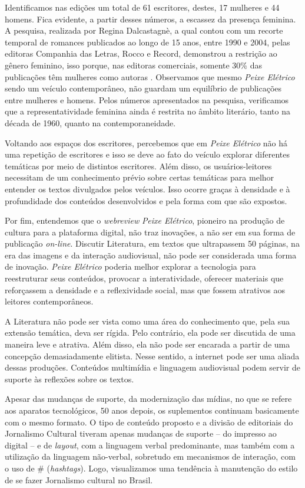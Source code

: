 \documentclass[portuguese]{textolivre}
\begin{document}
Identificamos nas edições um total de 61 escritores, destes, 17 mulheres e 44 homens. Fica evidente, a partir desses números, a escassez da presença feminina. A pesquisa, realizada por Regina Dalcastagnè, a qual contou com um recorte temporal de romances publicados ao longo de 15 anos, entre 1990 e 2004, pelas editoras Companhia das Letras, Rocco e Record, demonstrou a restrição ao gênero feminino, isso porque, nas editoras comerciais, somente 30\% das publicações têm mulheres como autoras \cite{dalcastagnè2005}. Observamos que mesmo \textit{Peixe Elétrico} sendo um veículo contemporâneo, não guardam um equilíbrio de publicações entre mulheres e homens. Pelos números apresentados na pesquisa, verificamos que a representatividade feminina ainda é restrita no âmbito literário, tanto na década de 1960, quanto na contemporaneidade.

Voltando aos espaços dos escritores, percebemos que em \textit{Peixe Elétrico} não há uma repetição de escritores e isso se deve ao fato do veículo explorar diferentes temáticas por meio de distintos escritores. Além disso, os usuários-leitores necessitam de um conhecimento prévio sobre certas temáticas para melhor entender os textos divulgados pelos veículos. Isso ocorre graças à densidade e à profundidade dos conteúdos desenvolvidos e pela forma com que são expostos.

Por fim, entendemos que o \textit{webreview} \textit{Peixe Elétrico}, pioneiro na produção de cultura para a plataforma digital, não traz inovações, a não ser em sua forma de publicação \textit{on-line}. Discutir Literatura, em textos que ultrapassem 50 páginas, na era das imagens e da interação audiovisual, não pode ser considerada uma forma de inovação. \textit{Peixe Elétrico} poderia melhor explorar a tecnologia para reestruturar seus conteúdos, provocar a interatividade, oferecer materiais que reforçassem a densidade e a reflexividade social, mas que fossem atrativos aos leitores contemporâneos.

A Literatura não pode ser vista como uma área do conhecimento que, pela sua extensão temática, deva ser rígida. Pelo contrário, ela pode ser discutida de uma maneira leve e atrativa. Além disso, ela não pode ser encarada a partir de uma concepção demasiadamente elitista. Nesse sentido, a internet pode ser uma aliada dessas produções. Conteúdos multimídia e linguagem audiovisual podem servir de suporte às reflexões sobre os textos.

Apesar das mudanças de suporte, da modernização das mídias, no que se refere aos aparatos tecnológicos, 50 anos depois, os suplementos continuam basicamente com o mesmo formato. O tipo de conteúdo proposto e a divisão de editoriais do Jornalismo Cultural tiveram apenas mudanças de suporte – do impresso ao digital – e de \textit{layout}, com a linguagem verbal predominante, mas também com a utilização da linguagem não-verbal, sobretudo em mecanismos de interação, com o uso de \# (\textit{hashtags}). Logo, visualizamos uma tendência à manutenção do estilo de se fazer Jornalismo cultural no Brasil.
\end{document}
